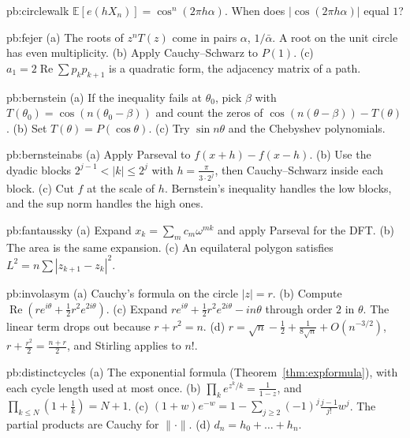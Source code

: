 \begin{hint}{pb:circlewalk}
$\mathbb E[e(hX_n)]=\cos^n(2\pi h\alpha)$. When does $|\cos(2\pi h\alpha)|$ equal $1$?
\end{hint}

\begin{hint}{pb:fejer}
(a) The roots of $z^nT(z)$ come in pairs $\alpha$, $1/\bar\alpha$. A root on the unit circle has even
multiplicity. (b) Apply Cauchy--Schwarz to $P(1)$. (c) $a_1=2\operatorname{Re}\sum p_kp_{k+1}$ is a quadratic form, the adjacency matrix of a path.
\end{hint}

\begin{hint}{pb:bernstein}
(a) If the inequality fails at $\theta_0$, pick $\beta$ with $T(\theta_0)=\cos(n(\theta_0-\beta))$ and count the zeros of $\cos(n(\theta-\beta))-T(\theta)$. (b) Set $T(\theta)=P(\cos\theta)$.
(c) Try $\sin n\theta$ and the Chebyshev polynomials.
\end{hint}

\begin{hint}{pb:bernsteinabs}
(a) Apply Parseval to $f(x+h)-f(x-h)$. (b) Use the dyadic blocks $2^{j-1}<|k|\le2^j$ with $h=\frac\pi{3\cdot2^j}$, then Cauchy--Schwarz inside each block. (c) Cut
$f$ at the scale of $h$. Bernstein's inequality handles the low blocks, and the sup norm handles the high ones.
\end{hint}

\begin{hint}{pb:fantaussky}
(a) Expand $x_k=\sum_mc_m\omega^{mk}$ and apply Parseval for the DFT. (b) The area is the same expansion. (c) An equilateral polygon satisfies
$L^2=n\sum|z_{k+1}-z_k|^2$.
\end{hint}

\begin{hint}{pb:involasym}
(a) Cauchy's formula on the circle $|z|=r$. (b) Compute $\operatorname{Re}(re^{i\theta}+\frac12r^2e^{2i\theta})$. (c) Expand $re^{i\theta}+\frac12r^2e^{2i\theta}-in\theta$ through order $2$ in $\theta$. The
linear term drops out because $r+r^2=n$. (d) $r=\sqrt n-\frac12+\frac1{8\sqrt n}+O(n^{-3/2})$, $r+\frac{r^2}2=\frac{n+r}2$, and Stirling applies to $n!$.
\end{hint}

\begin{hint}{pb:distinctcycles}
(a) The exponential formula (Theorem~\ref{thm:expformula}), with each cycle length used at most once. (b) $\prod_ke^{z^k/k}=\frac1{1-z}$, and $\prod_{k\le N}(1+\frac1k)=N+1$.
(c) $(1+w)e^{-w}=1-\sum_{j\ge2}(-1)^j\frac{j-1}{j!}w^j$. The partial products are Cauchy for $\|\cdot\|$. (d) $d_n=h_0+\dots+h_n$.
\end{hint}

